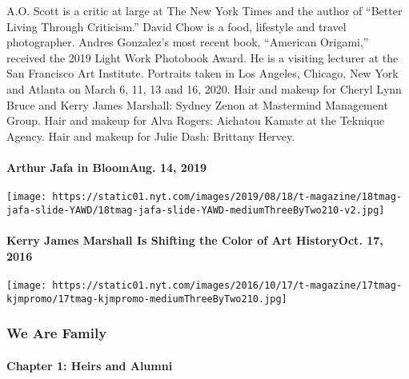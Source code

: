 A.O. Scott is a critic at large at The New York Times and the author of
``Better Living Through Criticism.'' David Chow is a food, lifestyle and
travel photographer. Andres Gonzalez's most recent book, ``American
Origami,'' received the 2019 Light Work Photobook Award. He is a
visiting lecturer at the San Francisco Art Institute. Portraits taken in
Los Angeles, Chicago, New York and Atlanta on March 6, 11, 13 and 16,
2020. Hair and makeup for Cheryl Lynn Bruce and Kerry James Marshall:
Sydney Zenon at Mastermind Management Group. Hair and makeup for Alva
Rogers: Aichatou Kamate at the Teknique Agency. Hair and makeup for
Julie Dash: Brittany Hervey.

\href{https://www.nytimes.com/2019/08/14/t-magazine/arthur-jafa-in-bloom.html}{}

\hypertarget{arthur-jafa-in-bloomaug-14-2019}{%
\paragraph{Arthur Jafa in BloomAug. 14,
2019}\label{arthur-jafa-in-bloomaug-14-2019}}

\texttt{[image: https://static01.nyt.com/images/2019/08/18/t-magazine/18tmag-jafa-slide-YAWD/18tmag-jafa-slide-YAWD-mediumThreeByTwo210-v2.jpg]}
\href{https://www.nytimes.com/2016/10/17/t-magazine/kerry-james-marshall-artist.html}{}

\hypertarget{kerry-james-marshall-is-shifting-the-color-of-art-historyoct-17-2016}{%
\paragraph{Kerry James Marshall Is Shifting the Color of Art HistoryOct.
17,
2016}\label{kerry-james-marshall-is-shifting-the-color-of-art-historyoct-17-2016}}

\texttt{[image: https://static01.nyt.com/images/2016/10/17/t-magazine/17tmag-kjmpromo/17tmag-kjmpromo-mediumThreeByTwo210.jpg]}

\hypertarget{we-are-family-1}{%
\subsubsection{We Are Family}\label{we-are-family-1}}

\hypertarget{chapter-1-heirs-and-alumni}{%
\paragraph{Chapter 1: Heirs and
Alumni}\label{chapter-1-heirs-and-alumni}}

